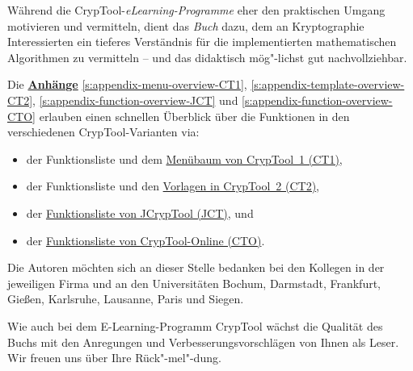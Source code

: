 Während die CrypTool-\textit{eLearning-Programme} eher den
praktischen Umgang motivieren und vermitteln, dient das \textit{Buch} dazu,
dem an Kryptographie Interessierten ein tieferes Verständnis für die
implementierten mathematischen Algorithmen zu vermitteln -- und das
didaktisch mög"-lichst gut nachvollziehbar.

Die \hyperlink{appendix-start}{\bf Anhänge}
\ref{s:appendix-menu-overview-CT1},
\ref{s:appendix-template-overview-CT2},
\ref{s:appendix-function-overview-JCT} und
\ref{s:appendix-function-overview-CTO}
erlauben einen schnellen Überblick über die Funktionen in den verschiedenen
CrypTool-Varianten via:
\begin{itemize}
  \item der Funktionsliste und
        dem \hyperlink{appendix-menu-overview-CT1}
                      {Menübaum von CrypTool~1 (CT1)},
  \item der Funktionsliste und
        den \hyperlink{appendix-template-overview-CT2}
                      {Vorlagen in CrypTool~2 (CT2)},
  \item der \hyperlink{appendix-function-overview-JCT}
                      {Funktionsliste von JCrypTool (JCT)}, und
  \item der \hyperlink{appendix-function-overview-CTO}
                      {Funktionsliste von CrypTool-Online (CTO)}.
\end{itemize}

Die Autoren möchten sich an dieser Stelle bedanken bei den Kollegen
in der jeweiligen Firma und an den Universitäten Bochum, Darmstadt, Frankfurt,
Gießen, Karlsruhe, Lausanne, Paris und Siegen.

\enlargethispage{0.5cm}
Wie auch bei dem E-Learning-Programm CrypTool wächst
die Qualität des Buchs mit den Anregungen und Verbesserungsvorschlägen
von Ihnen als Leser. Wir freuen uns über Ihre Rück"-mel"-dung.



